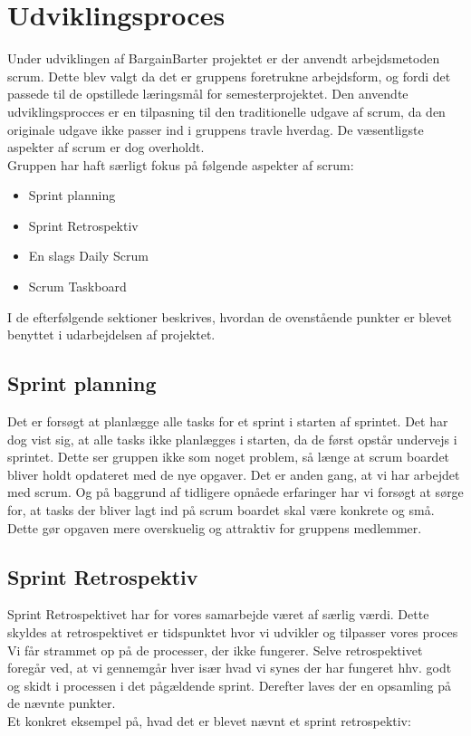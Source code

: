 \chapter{Udviklingsproces}

Under udviklingen af BargainBarter projektet er der anvendt arbejdsmetoden scrum\cite{SCRUM}. Dette blev valgt da det er gruppens foretrukne arbejdsform, og fordi det passede til de opstillede læringsmål for semesterprojektet. Den anvendte udviklingsprocces er en tilpasning til den traditionelle udgave af scrum, da den originale udgave ikke passer ind i gruppens travle hverdag. De væsentligste aspekter af scrum er dog overholdt. \\ Gruppen har haft særligt fokus på følgende aspekter af scrum:

\begin{itemize}
		\item Sprint planning
		\item Sprint Retrospektiv
		\item En slags Daily Scrum
		\item Scrum Taskboard
	\end{itemize}

\noindent I de efterfølgende sektioner beskrives, hvordan de ovenstående punkter er blevet benyttet i udarbejdelsen af projektet. 

\section{Sprint planning}
Det er forsøgt at planlægge alle tasks for et sprint i starten af sprintet. Det har dog vist sig, at alle tasks ikke planlægges i starten, da de først opstår undervejs i sprintet. Dette ser gruppen ikke som noget problem, så længe at scrum boardet bliver holdt opdateret med de nye opgaver. Det er anden gang, at vi har arbejdet med scrum. Og på baggrund af tidligere opnåede erfaringer har vi forsøgt at sørge for, at tasks der bliver lagt ind på scrum boardet skal være konkrete og små. Dette gør opgaven mere overskuelig og attraktiv for gruppens medlemmer.  


\section{Sprint Retrospektiv}
Sprint Retrospektivet har for vores samarbejde været af særlig værdi. Dette skyldes at retrospektivet er tidspunktet hvor vi udvikler og tilpasser vores proces Vi får strammet op på de processer, der ikke fungerer. Selve retrospektivet foregår ved, at vi gennemgår hver især hvad vi synes der har fungeret hhv. godt og skidt i processen i det pågældende sprint. Derefter laves der en opsamling på de nævnte punkter.\\ Et konkret eksempel på, hvad det er blevet nævnt et sprint retrospektiv:

